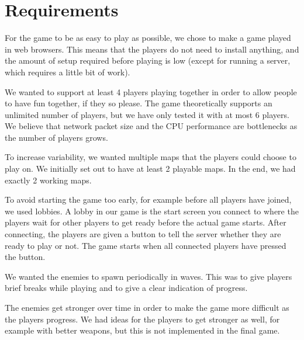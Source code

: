\documentclass[a4paper]{article}
\begin{document}

\section{Requirements}

For the game to be as easy to play as possible, we chose to make a game played in web browsers. This means that the players do not need to install anything, and the amount of setup required before playing is low (except for running a server, which requires a little bit of work).

We wanted to support at least 4 players playing together in order to allow people to have fun together, if they so please. The game theoretically supports an unlimited number of players, but we have only tested it with at most 6 players. We believe that network packet size and the CPU performance are bottlenecks as the number of players grows.

To increase variability, we wanted multiple maps that the players could choose to play on. We initially set out to have at least 2 playable maps. In the end, we had exactly 2 working maps.

To avoid starting the game too early, for example before all players have joined, we used lobbies. A lobby in our game is the start screen you connect to where the players wait for other players to get ready before the actual game starts. After connecting, the players are given a button to tell the server whether they are ready to play or not. The game starts when all connected players have pressed the button.

We wanted the enemies to spawn periodically in waves. This was to give players brief breaks while playing and to give a clear indication of progress.

The enemies get stronger over time in order to make the game more difficult as the players progress. We had ideas for the players to get stronger as well, for example with better weapons, but this is not implemented in the final game.
\end{document}
